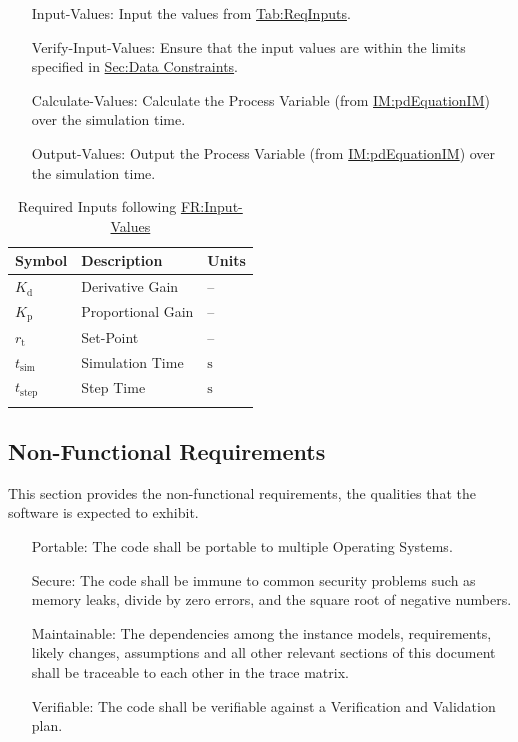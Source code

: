 \documentclass[12pt]{article}
\begin{document}
\begin{itemize}
\item[Input-Values:\phantomsection\label{inputValues}]{Input the values from \hyperref[Table:ReqInputs]{Tab:ReqInputs}.}
\item[Verify-Input-Values:\phantomsection\label{verifyInputs}]{Ensure that the input values are within the limits specified in \hyperref[Sec:DataConstraints]{Sec:Data Constraints}.}
\item[Calculate-Values:\phantomsection\label{calculateValues}]{Calculate the Process Variable (from \hyperref[IM:pdEquationIM]{IM:pdEquationIM}) over the simulation time.}
\item[Output-Values:\phantomsection\label{outputValues}]{Output the Process Variable (from \hyperref[IM:pdEquationIM]{IM:pdEquationIM}) over the simulation time.}
\end{itemize}
\begin{longtable}{l l l}
\toprule
\textbf{Symbol} & \textbf{Description} & \textbf{Units}
\\
\midrule
\endhead
${K_{\text{d}}}$ & Derivative Gain & --
\\
${K_{\text{p}}}$ & Proportional Gain & --
\\
${r_{\text{t}}}$ & Set-Point & --
\\
${t_{\text{sim}}}$ & Simulation Time & ${\text{s}}$
\\
${t_{\text{step}}}$ & Step Time & ${\text{s}}$
\\
\bottomrule
\caption{Required Inputs following \hyperref[inputValues]{FR:Input-Values}}
\label{Table:ReqInputs}
\end{longtable}
\subsection{Non-Functional Requirements}
\label{Sec:NFRs}
This section provides the non-functional requirements, the qualities that the software is expected to exhibit.

\begin{itemize}
\item[Portable:\phantomsection\label{portability}]{The code shall be portable to multiple Operating Systems.}
\item[Secure:\phantomsection\label{security}]{The code shall be immune to common security problems such as memory leaks, divide by zero errors, and the square root of negative numbers.}
\item[Maintainable:\phantomsection\label{maintainability}]{The dependencies among the instance models, requirements, likely changes, assumptions and all other relevant sections of this document shall be traceable to each other in the trace matrix.}
\item[Verifiable:\phantomsection\label{verifiability}]{The code shall be verifiable against a Verification and Validation plan.}
\end{itemize}
\end{document}
